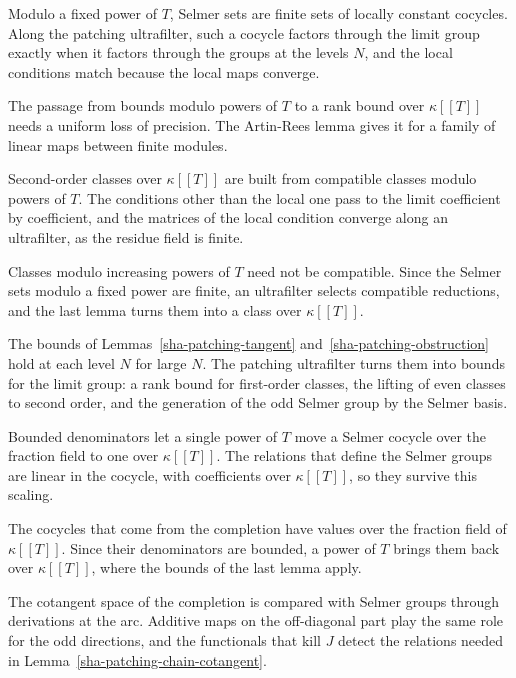 Modulo a fixed power of $T$, Selmer sets are finite sets of locally constant cocycles. Along the patching ultrafilter, such a cocycle factors through the limit group exactly when it factors through the groups at the levels $N$, and the local conditions match because the local maps converge.

The passage from bounds modulo powers of $T$ to a rank bound over $\kappa[[T]]$ needs a uniform loss of precision. The Artin-Rees lemma gives it for a family of linear maps between finite modules.

Second-order classes over $\kappa[[T]]$ are built from compatible classes modulo powers of $T$. The conditions other than the local one pass to the limit coefficient by coefficient, and the matrices of the local condition converge along an ultrafilter, as the residue field is finite.

Classes modulo increasing powers of $T$ need not be compatible. Since the Selmer sets modulo a fixed power are finite, an ultrafilter selects compatible reductions, and the last lemma turns them into a class over $\kappa[[T]]$.

The bounds of Lemmas~\ref{sha-patching-tangent} and~\ref{sha-patching-obstruction} hold at each level $N$ for large $N$. The patching ultrafilter turns them into bounds for the limit group: a rank bound for first-order classes, the lifting of even classes to second order, and the generation of the odd Selmer group by the Selmer basis.

Bounded denominators let a single power of $T$ move a Selmer cocycle over the fraction field to one over $\kappa[[T]]$. The relations that define the Selmer groups are linear in the cocycle, with coefficients over $\kappa[[T]]$, so they survive this scaling.

The cocycles that come from the completion have values over the fraction field of $\kappa[[T]]$. Since their denominators are bounded, a power of $T$ brings them back over $\kappa[[T]]$, where the bounds of the last lemma apply.

The cotangent space of the completion is compared with Selmer groups through derivations at the arc. Additive maps on the off-diagonal part play the same role for the odd directions, and the functionals that kill $J$ detect the relations needed in Lemma~\ref{sha-patching-chain-cotangent}.

